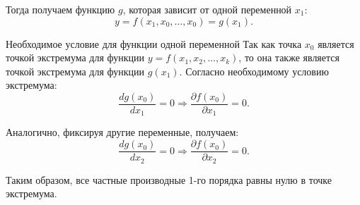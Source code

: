 Тогда получаем функцию \( g \), которая зависит от одной переменной \( x_1 \):
\begin{equation}
	y = f(x_1, x_0, \dots, x_0) = g(x_1).
\end{equation}

\begin{tbox}{Необходимое условие для функции одной переменной}
	Так как точка \( x_0 \) является точкой экстремума для функции \( y = f(x_1, x_2, \dots, x_k) \), то она также является точкой экстремума для функции \( g(x_1) \). Согласно необходимому условию экстремума:
	\begin{equation}
		\frac{dg(x_0)}{dx_1} = 0 \Rightarrow \frac{\partial f(x_0)}{\partial x_1} = 0.
	\end{equation}
\end{tbox}

Аналогично, фиксируя другие переменные, получаем:
\begin{equation}
	\frac{dg(x_0)}{dx_2} = 0 \Rightarrow \frac{\partial f(x_0)}{\partial x_2} = 0.
\end{equation}

Таким образом, все частные производные 1-го порядка равны нулю в точке экстремума.
